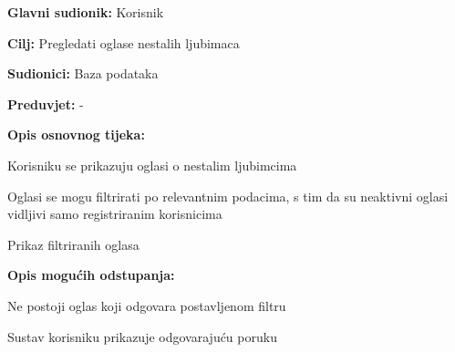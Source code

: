 					\noindent {}
					\begin{packed_item}
	
						\item \textbf{Glavni sudionik:} Korisnik
						\item  \textbf{Cilj:} Pregledati oglase nestalih ljubimaca
						\item  \textbf{Sudionici:} Baza podataka
						\item  \textbf{Preduvjet:} -
						\item  \textbf{Opis osnovnog tijeka:}
						
						\item[] \begin{packed_enum}
	
							\item Korisniku se prikazuju oglasi o nestalim ljubimcima
							\item Oglasi se mogu filtrirati po relevantnim podacima, s tim da su neaktivni oglasi vidljivi samo registriranim korisnicima
							\item Prikaz filtriranih oglasa
						\end{packed_enum}
						
						\item  \textbf{Opis mogućih odstupanja:}
						
						\item[] \begin{packed_item}
	
							\item[2.a] Ne postoji oglas koji odgovara postavljenom filtru
							\item[] \begin{packed_enum}
								
								\item Sustav korisniku prikazuje odgovarajuću poruku
								
							\end{packed_enum}
							
						\end{packed_item}
					\end{packed_item}
					
